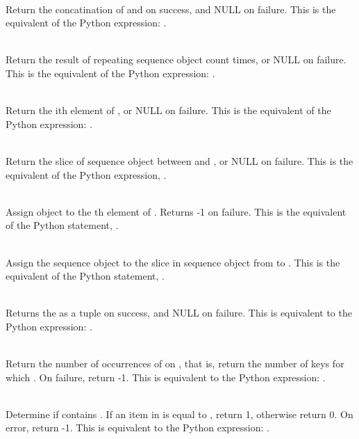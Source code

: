     \\
	 Return the concatination of  and  on success, and NULL on
	 failure.   This is the equivalent of the Python
	 expression: .


     \\
	 Return the result of repeating sequence object  count times,
	 or NULL on failure.  This is the equivalent of the Python
	 expression: .


     \\
	 Return the ith element of , or NULL on failure. This is the
	 equivalent of the Python expression: .


     \\
	 Return the slice of sequence object  between  and , or
	 NULL on failure. This is the equivalent of the Python
	 expression, .


     \\
	 Assign object  to the th element of .
Returns -1 on failure.  This is the equivalent of the Python
	 statement, .

     \\
         Assign the sequence object  to the slice in sequence
	 object  from  to .  This is the equivalent of the Python
	 statement, .

     \\
	 Returns the  as a tuple on success, and NULL on failure.
	 This is equivalent to the Python expression: .

     \\
         Return the number of occurrences of  on , that is,
	 return the number of keys for which .  On
	 failure, return -1.  This is equivalent to the Python
	 expression: .

     \\
	 Determine if  contains .  If an item in  is equal to
	 , return 1, otherwise return 0.  On error, return -1.  This
	 is equivalent to the Python expression: .

